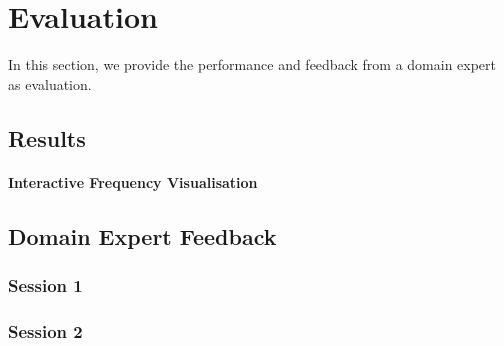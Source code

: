 \clearpage
\section{Evaluation}
In this section, we provide the performance and feedback from a domain expert as evaluation.

\subsection{Results}
\paragraph{Interactive Frequency Visualisation}
\paragraph[]{}


\subsection{Domain Expert Feedback}

\subsubsection{Session 1}

\subsubsection{Session 2}
